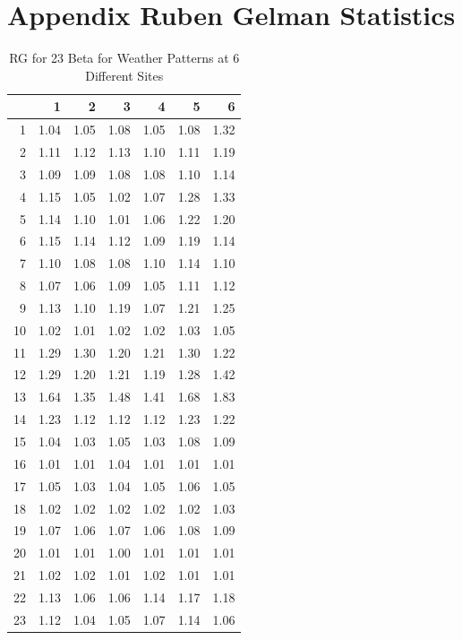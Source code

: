 \documentclass[11pt]{article}
\begin{document}
\newpage
\section{Appendix Ruben Gelman Statistics}\label{sec:appendixtwo}

\begin{table}[ht]\caption{RG for 23 Beta for Weather Patterns at 6 Different Sites}
\centering
\begin{tabular}{rrrrrrr}
  \hline
 & 1 & 2 & 3 & 4 & 5 & 6 \\ 
  \hline
1 & 1.04 & 1.05 & 1.08 & 1.05 & 1.08 & 1.32 \\ 
  2 & 1.11 & 1.12 & 1.13 & 1.10 & 1.11 & 1.19 \\ 
  3 & 1.09 & 1.09 & 1.08 & 1.08 & 1.10 & 1.14 \\ 
  4 & 1.15 & 1.05 & 1.02 & 1.07 & 1.28 & 1.33 \\ 
  5 & 1.14 & 1.10 & 1.01 & 1.06 & 1.22 & 1.20 \\ 
  6 & 1.15 & 1.14 & 1.12 & 1.09 & 1.19 & 1.14 \\ 
  7 & 1.10 & 1.08 & 1.08 & 1.10 & 1.14 & 1.10 \\ 
  8 & 1.07 & 1.06 & 1.09 & 1.05 & 1.11 & 1.12 \\ 
  9 & 1.13 & 1.10 & 1.19 & 1.07 & 1.21 & 1.25 \\ 
  10 & 1.02 & 1.01 & 1.02 & 1.02 & 1.03 & 1.05 \\ 
  11 & 1.29 & 1.30 & 1.20 & 1.21 & 1.30 & 1.22 \\ 
  12 & 1.29 & 1.20 & 1.21 & 1.19 & 1.28 & 1.42 \\ 
  13 & 1.64 & 1.35 & 1.48 & 1.41 & 1.68 & 1.83 \\ 
  14 & 1.23 & 1.12 & 1.12 & 1.12 & 1.23 & 1.22 \\ 
  15 & 1.04 & 1.03 & 1.05 & 1.03 & 1.08 & 1.09 \\ 
  16 & 1.01 & 1.01 & 1.04 & 1.01 & 1.01 & 1.01 \\ 
  17 & 1.05 & 1.03 & 1.04 & 1.05 & 1.06 & 1.05 \\ 
  18 & 1.02 & 1.02 & 1.02 & 1.02 & 1.02 & 1.03 \\ 
  19 & 1.07 & 1.06 & 1.07 & 1.06 & 1.08 & 1.09 \\ 
  20 & 1.01 & 1.01 & 1.00 & 1.01 & 1.01 & 1.01 \\ 
  21 & 1.02 & 1.02 & 1.01 & 1.02 & 1.01 & 1.01 \\ 
  22 & 1.13 & 1.06 & 1.06 & 1.14 & 1.17 & 1.18 \\ 
  23 & 1.12 & 1.04 & 1.05 & 1.07 & 1.14 & 1.06 \\ 
   \hline
\end{tabular}
\end{table}
\end{document}
